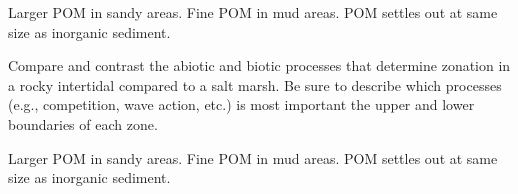 \documentclass[11pt, addpoints]{exam}
\newcommand*\AnswerBox[2]{%
    \parbox[t][#1]{0.92\textwidth}{%
    \begin{solution}#2\end{solution}}
    \vspace*{\stretch{1}}
}
\begin{document}
\begin{questions}
\AnswerBox{0.25\textheight}{Larger POM in sandy areas. Fine POM in mud areas. POM settles out at same size as inorganic sediment.}


\question[10]
Compare and contrast the abiotic and biotic processes that determine zonation in a rocky intertidal compared to a salt marsh. Be sure to describe which processes (e.g., competition, wave action, etc.) is most important the upper and lower boundaries of each zone.

\AnswerBox{0.5\textheight}{Larger POM in sandy areas. Fine POM in mud areas. POM settles out at same size as inorganic sediment.}

\end{questions}
\end{document}
